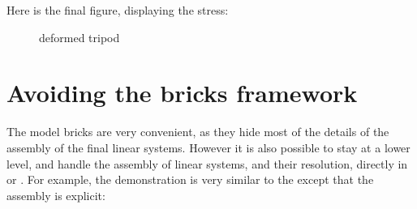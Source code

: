 \documentclass[a4paper,11pt,english]{sphinxmanual}
\begin{document}
\sphinxAtStartPar
Here is the final figure, displaying the  stress:

\begin{figure}[htbp]
\centering
\capstart

\noindent{}
\caption{deformed tripod}\label{\detokenize{matlab_octave/examples:id1}}\label{\detokenize{matlab_octave/examples:malb-fig-tripod-vm}}\end{figure}


\section{Avoiding the bricks framework}
\label{\detokenize{matlab_octave/examples:avoiding-the-bricks-framework}}
\sphinxAtStartPar
The model bricks are very convenient, as they hide most of the details of the
assembly of the final linear systems. However it is also possible to stay at a
lower level, and handle the assembly of linear systems, and their resolution,
directly in  or . For example, the demonstration  is
very similar to the  except that the assembly is explicit:
\end{document}
